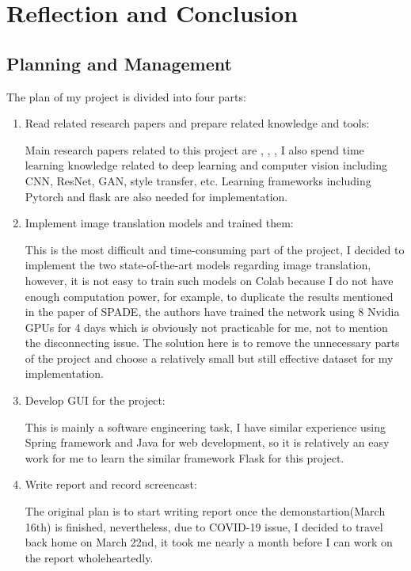 \chapter{Reflection and Conclusion}
\section{Planning and Management}
The plan of my project is divided into four parts:
\begin{enumerate}
    \item Read related research papers and prepare related knowledge and tools:
    
    Main research papers related to this project are \cite{pix2pix2016}, \cite{wang2018pix2pixHD},
    \cite{park2019SPADE}, I also spend time learning knowledge related to deep 
    learning and computer vision including CNN, ResNet, GAN, style transfer, etc. 
    Learning frameworks including Pytorch and flask are also needed for implementation.
    \item Implement image translation models and trained them:
    
    This is the most difficult and time-consuming part of the project, I decided to implement 
    the two state-of-the-art models regarding image translation, however, it is not easy to 
    train such models on Colab because I do not have enough computation power, for example, 
    to duplicate the results mentioned in the paper of SPADE, the authors have trained the 
    network using 8 Nvidia GPUs for 4 days which is obviously not practicable for me, not to 
    mention the disconnecting issue. The solution here is to remove the unnecessary parts of 
    the project and choose a relatively small but still effective dataset for my implementation.
    \item Develop GUI for the project: 
    
    This is mainly a software engineering task, I have similar experience using Spring framework 
    and Java for web development, so it is relatively an easy work for me to learn the similar 
    framework Flask for this project.
    \item Write report and record screencast: 
    
    The original plan is to start writing report once the demonstartion(March 16th) is finished, 
    nevertheless, due to COVID-19 issue, I decided to travel back home on March 22nd, it took me 
    nearly a month before I can work on the report wholeheartedly.
\end{enumerate}

